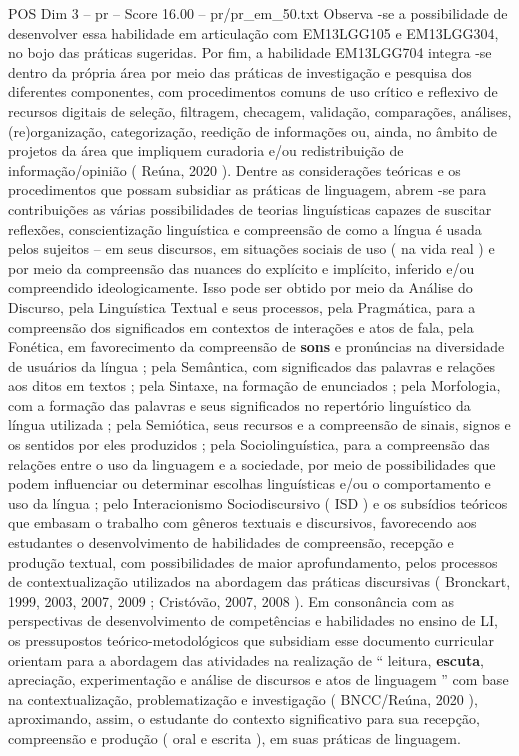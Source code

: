 \begin{textsample}{POS Dim 3 – pr – Score 16.00 – pr/pr\_em\_50.txt}
Observa -se a possibilidade de desenvolver essa habilidade em articulação com EM13LGG105 e EM13LGG304, no bojo das práticas sugeridas.
Por fim, a habilidade EM13LGG704 integra -se dentro da própria área por meio das práticas de investigação e pesquisa dos diferentes componentes, com procedimentos comuns de uso crítico e reflexivo de recursos digitais de seleção, filtragem, checagem, validação, comparações, análises, (re)organização, categorização, reedição de informações ou, ainda, no âmbito de projetos da área que impliquem curadoria e/ou redistribuição de informação/opinião ( Reúna, 2020 ).
Dentre as considerações teóricas e os procedimentos que possam subsidiar as práticas de linguagem, abrem -se para contribuições as várias possibilidades de teorias linguísticas capazes de suscitar reflexões, conscientização linguística e compreensão de como a língua é usada pelos sujeitos – em seus discursos, em situações sociais de uso ( na vida real ) e por meio da compreensão das nuances do explícito e implícito, inferido e/ou compreendido ideologicamente.
Isso pode ser obtido por meio da Análise do Discurso, pela Linguística Textual e seus processos, pela Pragmática, para a compreensão dos significados em contextos de interações e atos de fala, pela Fonética, em favorecimento da compreensão de \textbf{sons} e pronúncias na diversidade de usuários da língua ; pela Semântica, com significados das palavras e relações aos ditos em textos ; pela Sintaxe, na formação de enunciados ; pela Morfologia, com a formação das palavras e seus significados no repertório linguístico da língua utilizada ; pela Semiótica, seus recursos e a compreensão de sinais, signos e os sentidos por eles produzidos ; pela Sociolinguística, para a compreensão das relações entre o uso da linguagem e a sociedade, por meio de possibilidades que podem influenciar ou determinar escolhas linguísticas e/ou o comportamento e uso da língua ; pelo Interacionismo Sociodiscursivo ( ISD ) e os subsídios teóricos que embasam o trabalho com gêneros textuais e discursivos, favorecendo aos estudantes o desenvolvimento de habilidades de compreensão, recepção e produção textual, com possibilidades de maior aprofundamento, pelos processos de contextualização utilizados na abordagem das práticas discursivas ( Bronckart, 1999, 2003, 2007, 2009 ; Cristóvão, 2007, 2008 ).
Em consonância com as perspectivas de desenvolvimento de competências e habilidades no ensino de LI, os pressupostos teórico-metodológicos que subsidiam esse documento curricular orientam para a abordagem das atividades na realização de “ leitura, \textbf{escuta}, apreciação, experimentação e análise de discursos e atos de linguagem ” com base na contextualização, problematização e investigação ( BNCC/Reúna, 2020 ), aproximando, assim, o estudante do contexto significativo para sua recepção, compreensão e produção ( oral e escrita ), em suas práticas de linguagem.

\end{textsample}
